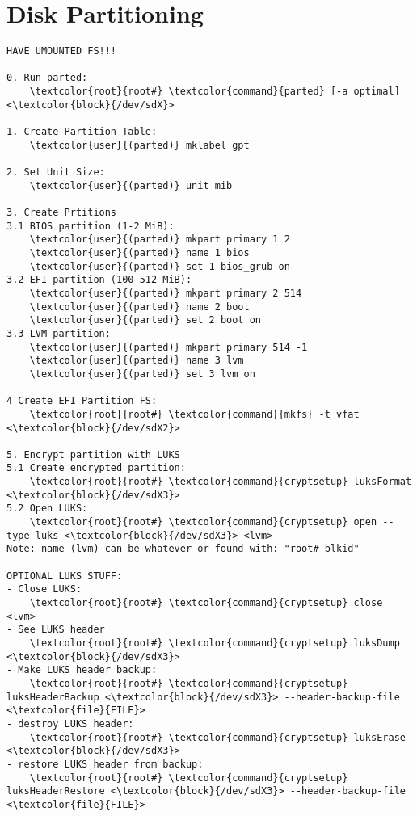 \documentclass[10pt, a4paper, onecolumn, openany]{book}         %
\begin{document}
\section{Disk Partitioning}
\begin{Verbatim}[commandchars=\\\{\}]
HAVE UMOUNTED FS!!!

0. Run parted:
    \textcolor{root}{root#} \textcolor{command}{parted} [-a optimal] <\textcolor{block}{/dev/sdX}>

1. Create Partition Table:
    \textcolor{user}{(parted)} mklabel gpt
    
2. Set Unit Size:
    \textcolor{user}{(parted)} unit mib
    
3. Create Prtitions
3.1 BIOS partition (1-2 MiB):
    \textcolor{user}{(parted)} mkpart primary 1 2
    \textcolor{user}{(parted)} name 1 bios
    \textcolor{user}{(parted)} set 1 bios_grub on
3.2 EFI partition (100-512 MiB):
    \textcolor{user}{(parted)} mkpart primary 2 514
    \textcolor{user}{(parted)} name 2 boot
    \textcolor{user}{(parted)} set 2 boot on
3.3 LVM partition:
    \textcolor{user}{(parted)} mkpart primary 514 -1
    \textcolor{user}{(parted)} name 3 lvm
    \textcolor{user}{(parted)} set 3 lvm on

4 Create EFI Partition FS:
    \textcolor{root}{root#} \textcolor{command}{mkfs} -t vfat <\textcolor{block}{/dev/sdX2}>

5. Encrypt partition with LUKS
5.1 Create encrypted partition:
    \textcolor{root}{root#} \textcolor{command}{cryptsetup} luksFormat <\textcolor{block}{/dev/sdX3}>
5.2 Open LUKS:
    \textcolor{root}{root#} \textcolor{command}{cryptsetup} open --type luks <\textcolor{block}{/dev/sdX3}> <lvm>
Note: name (lvm) can be whatever or found with: "root# blkid"

OPTIONAL LUKS STUFF:
- Close LUKS:
    \textcolor{root}{root#} \textcolor{command}{cryptsetup} close <lvm>
- See LUKS header
    \textcolor{root}{root#} \textcolor{command}{cryptsetup} luksDump <\textcolor{block}{/dev/sdX3}>
- Make LUKS header backup:
    \textcolor{root}{root#} \textcolor{command}{cryptsetup} luksHeaderBackup <\textcolor{block}{/dev/sdX3}> --header-backup-file <\textcolor{file}{FILE}>
- destroy LUKS header:
    \textcolor{root}{root#} \textcolor{command}{cryptsetup} luksErase <\textcolor{block}{/dev/sdX3}>
- restore LUKS header from backup:
    \textcolor{root}{root#} \textcolor{command}{cryptsetup} luksHeaderRestore <\textcolor{block}{/dev/sdX3}> --header-backup-file <\textcolor{file}{FILE}>


\end{Verbatim}
\end{document}
